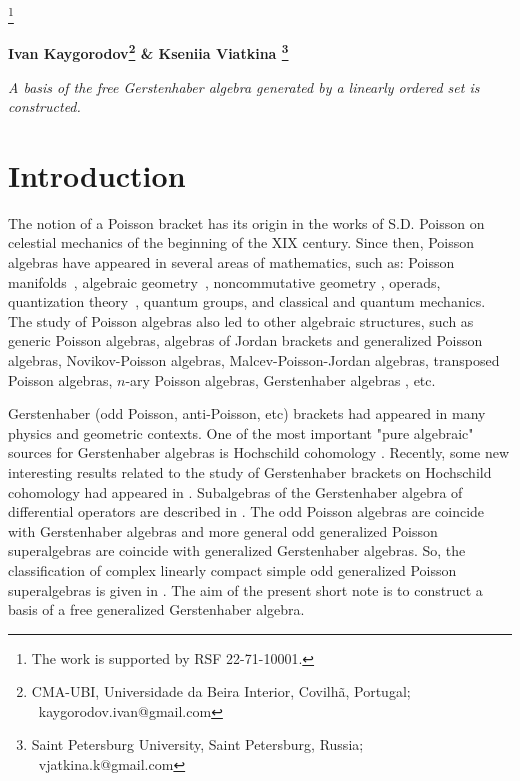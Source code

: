 \documentclass[secthm,seceqn,amsthm,ussrhead,reqno,12pt]{amsart}
\theoremstyle{plain}
\begin{document}
 
 
 

\footnote{
The work  is  supported by RSF 22-71-10001.
}
 

 \bigskip


 \bigskip

\begin{center}

 {\bf
Ivan Kaygorodov\footnote{CMA-UBI, Universidade da Beira Interior, Covilh\~{a}, Portugal; \    kaygorodov.ivan@gmail.com} \&
 Kseniia Viatkina \footnote{Saint Petersburg  University, Saint Petersburg, Russia; \ vjatkina.k@gmail.com}  }
 


 

\end{center}


{\it  A basis of the free Gerstenhaber algebra generated by a linearly ordered set  is constructed.
 }

 \bigskip


 \bigskip

 
 


\section*{Introduction}
	The notion of a Poisson bracket has its origin in the works of S.D. Poisson on celestial mechanics of the beginning of the XIX century. Since then, Poisson algebras
	have appeared in several areas of mathematics, such as:  
	Poisson manifolds~\cite{L1}, 
	algebraic geometry~\cite{BLLM,GK04}, 
	noncommutative geometry \cite{ber08},
	operads,
	quantization theory~\cite{Kon03}, 
	quantum
	groups, 
	and classical and quantum mechanics.
	The study of Poisson algebras also led to other algebraic structures, such as 
	generic Poisson algebras,
	algebras of Jordan brackets and generalized Poisson algebras,
	Novikov-Poisson algebras,
	Malcev-Poisson-Jordan algebras, 
	transposed Poisson algebras,
	$n$-ary Poisson algebras,
Gerstenhaber algebras \cite{K96}, etc.
	
 
Gerstenhaber   (odd Poisson, anti-Poisson, etc)	 brackets had appeared in many physics\cite{p1,p2} and geometric \cite{p3} contexts.
One of  	the most important "pure algebraic" sources for Gerstenhaber algebras is Hochschild cohomology \cite{Ger63}.
	Recently, some new interesting results   related to the study of
	Gerstenhaber brackets on  Hochschild cohomology had appeared in \cite{W21,V16,V19,L21}.
	Subalgebras of the Gerstenhaber algebra of differential operators are described in \cite{B06}.
		The  odd Poisson algebras are coincide with Gerstenhaber algebras and more general
odd generalized Poisson superalgebras are coincide with generalized Gerstenhaber algebras.
So, the classification of complex linearly compact simple odd generalized Poisson superalgebras is given in \cite{CK10}.
The aim of the present short note is to  construct a basis of a free generalized 	Gerstenhaber algebra.
	
\end{document}
